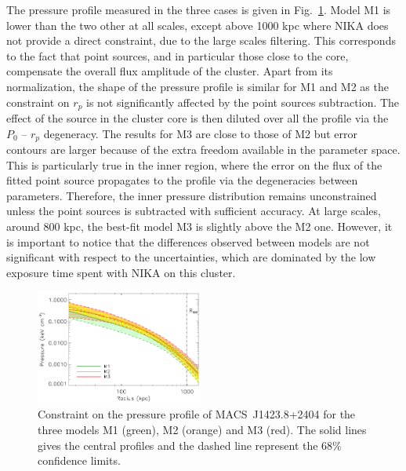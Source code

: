 \documentclass[twocolumn,traditabstract]{aa}
\begin{document}
The pressure profile measured in the three cases is given in Fig.~\ref{fig:MACSJ1424_pressure_point_source}. Model M1 is lower than the two other at all scales, except above 1000 kpc where NIKA does not provide a direct constraint, due to the large scales filtering. This corresponds to the fact that point sources, and in particular those close to the core, compensate the overall flux amplitude of the cluster. Apart from its normalization, the shape of the pressure profile is similar for M1 and M2 as the constraint on $r_p$ is not significantly affected by the point sources subtraction. The effect of the source in the cluster core is then diluted over all the profile via the $P_0$ -- $r_p$ degeneracy. The results for M3 are close to those of M2 but error contours are larger because of the extra freedom available in the parameter space. This is particularly true in the inner region, where the error on the flux of the fitted point source propagates to the profile via the degeneracies between parameters. Therefore, the inner pressure distribution remains unconstrained unless the point sources is subtracted with sufficient accuracy. At large scales, around 800 kpc, the best-fit model M3 is slightly above the M2 one. However, it is important to notice that the differences observed between models are not significant with respect to the uncertainties, which are dominated by the low exposure time spent with NIKA on this cluster.
\begin{figure}[h]
\centering
\includegraphics[width=0.49\textwidth]{Figure/ICM_pressure_profile_point_sources.pdf}
\caption{Constraint on the pressure profile of \mbox{MACS~J1423.8+2404} for the three models M1 (green), M2 (orange) and M3 (red). The solid lines gives the central profiles and the dashed line represent the 68\% confidence limits.}
\label{fig:MACSJ1424_pressure_point_source}
\end{figure}
\end{document}
